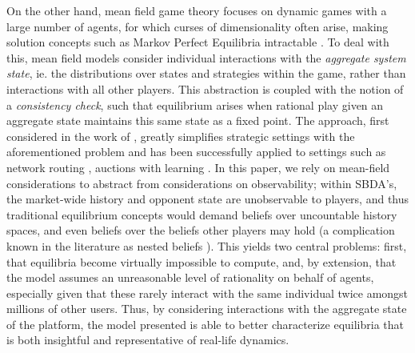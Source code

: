 On the other hand, mean field game theory focuses on dynamic games with a large number of agents, for which curses of dimensionality often arise, making solution concepts such as Markov Perfect Equilibria intractable \citep{maskin2001markov}. To deal with this, mean field models consider individual interactions with the \textit{aggregate system state}, ie. the distributions over states and strategies within the game, rather than interactions with all other players. This abstraction is coupled with the notion of a \textit{consistency check}, such that equilibrium arises when rational play given an aggregate state maintains this same state as a fixed point. The approach, first considered in the work of \cite{jovanovic1988anonymous}, greatly simplifies strategic settings with the aforementioned problem and has been successfully applied to settings such as network routing \citep{calderone2017markov}, auctions with learning \citep{iyer2014mean}. In this paper, we rely on mean-field considerations to abstract from considerations on observability; within SBDA's, the market-wide history and opponent state are unobservable to players, and thus traditional equilibrium concepts would demand beliefs over uncountable history spaces, and even beliefs over the beliefs other players may hold (a complication known in the literature as nested beliefs \citep{brandenburger1993hierarchies}). This yields two central problems: first, that equilibria become virtually impossible to compute, and, by extension, that the model assumes an unreasonable level of rationality on behalf of agents, especially given that these rarely interact with the same individual twice amongst millions of other users. Thus, by considering interactions with the aggregate state of the platform, the model presented is able to better characterize equilibria that is both insightful and representative of real-life dynamics.



